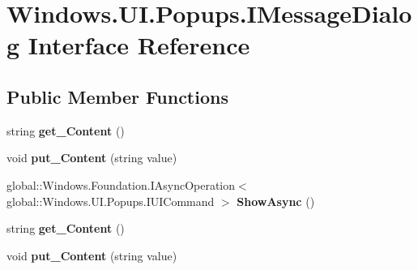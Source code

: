 \hypertarget{interface_windows_1_1_u_i_1_1_popups_1_1_i_message_dialog}{}\section{Windows.\+U\+I.\+Popups.\+I\+Message\+Dialog Interface Reference}
\label{interface_windows_1_1_u_i_1_1_popups_1_1_i_message_dialog}
\subsection*{Public Member Functions}
\begin{DoxyCompactItemize}
\item 
\mbox{\label{interface_windows_1_1_u_i_1_1_popups_1_1_i_message_dialog_adc3d7f4ba0a8c7bf9235fc45055b6059}} 
string {\bfseries get\+\_\+\+Content} ()
\item 
\mbox{\label{interface_windows_1_1_u_i_1_1_popups_1_1_i_message_dialog_aea604ec3be8c6b6404323ad84c708427}} 
void {\bfseries put\+\_\+\+Content} (string value)
\item 
\mbox{\label{interface_windows_1_1_u_i_1_1_popups_1_1_i_message_dialog_a86ab855938ef9e06722bd7cf897c1c2b}} 
global\+::\+Windows.\+Foundation.\+I\+Async\+Operation$<$ global\+::\+Windows.\+U\+I.\+Popups.\+I\+U\+I\+Command $>$ {\bfseries Show\+Async} ()
\item 
\mbox{\label{interface_windows_1_1_u_i_1_1_popups_1_1_i_message_dialog_adc3d7f4ba0a8c7bf9235fc45055b6059}} 
string {\bfseries get\+\_\+\+Content} ()
\item 
\mbox{\label{interface_windows_1_1_u_i_1_1_popups_1_1_i_message_dialog_aea604ec3be8c6b6404323ad84c708427}} 
void {\bfseries put\+\_\+\+Content} (string value)
\item 
\mbox{\label{interface_windows_1_1_u_i_1_1_popups_1_1_i_message_dialog_a86ab855938ef9e06722bd7cf897c1c2b}} 

\end{DoxyCompactItemize}
